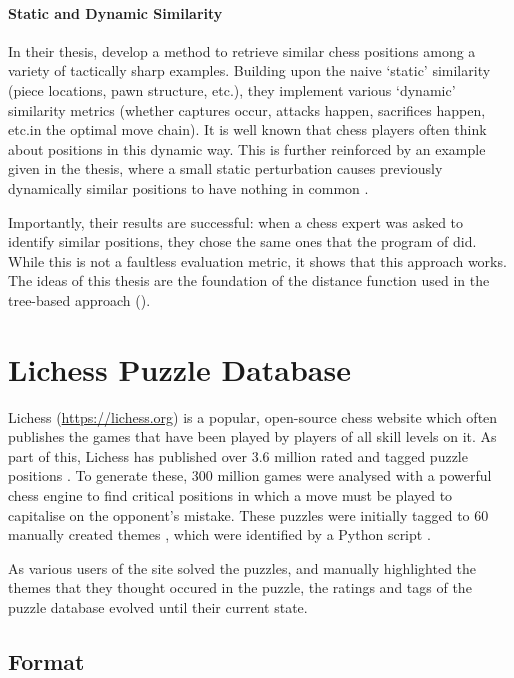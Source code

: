 \paragraph{Static and Dynamic Similarity}In their thesis, \citet{chessMotifs}
develop a method to retrieve similar chess positions among a variety of
tactically sharp examples. Building upon the naive `static' similarity (piece
locations, pawn structure, etc.\@), they implement various `dynamic' similarity
metrics (whether captures occur, attacks happen, sacrifices happen, etc.\@ in
the optimal move chain). It is well known \citep{thoughtAndChoice,
bilalic2010mechanisms} that chess players often think about positions in this
dynamic way. This is further reinforced by an example given in the thesis,
where a small static perturbation causes previously dynamically similar
positions to have nothing in common \citep{chessMotifs}.

Importantly, their results are successful: when a chess expert was asked to
identify similar positions, they chose the same ones that the program of
\cite{chessMotifs} did. While this is not a faultless evaluation metric, it
shows that this approach works. The ideas of this thesis are the foundation of
the distance function used in the tree-based approach ().

\section{Lichess Puzzle Database}\label{lichessPuzzlesSection}

Lichess (\url{https://lichess.org}) is a popular, open-source chess website
which often publishes the games that have been played by players of all skill
levels on it. As part of this, Lichess has published over 3.6 million rated and
tagged puzzle positions \citep{lichessPuzzles}. To generate these, 300 million
games were analysed with a powerful chess engine to find critical positions in
which a move must be played to capitalise on the opponent's mistake. These
puzzles were initially tagged to 60 manually created themes \citep{lichessXML},
which were identified by a Python script \citep{lichessTagger}.

As various users of the site solved the puzzles, and manually highlighted the
themes that they thought occured in the puzzle, the ratings and tags of the
puzzle database evolved until their current state.

\subsection{Format}

